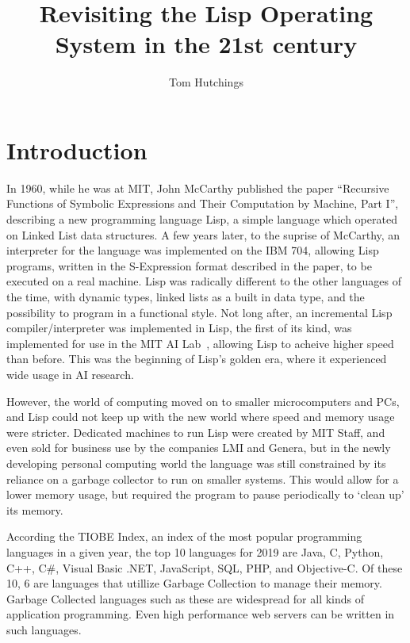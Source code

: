 \documentclass{article}
\begin{document}
  \title{Revisiting the Lisp Operating System in the 21st century}
  \author{Tom Hutchings}

  \maketitle

  \section{Introduction}
  \iffalse
  memory has increased massively
  show language marketshare, point out GC and interpreted languages, i.e. GC usage is viable
  but what about in an OS

  memory sharing hard
  lisp nice UI, fast development


  document split into sections describing the prior research in the topics this project touches on,
  the proposed implementation, resources required
  \fi
  
  In 1960, while he was at MIT, John McCarthy published the paper ``Recursive Functions of Symbolic Expressions and Their Computation by Machine, Part I''\cite{MccarthyJohn1960Rfos}, describing a new programming language Lisp, a simple language which operated on Linked List data structures. A few years later, to the suprise of McCarthy, an interpreter for the language was implemented on the IBM 704, allowing Lisp programs, written in the S-Expression format described in the paper, to be executed on a real machine. Lisp was radically different to the other languages of the time, with dynamic types, linked lists as a built in data type, and the possibility to program in a functional style. Not long after, an incremental Lisp compiler/interpreter was implemented in Lisp, the first of its kind, was implemented for use in the MIT AI Lab~\cite{ai-memo-39}, allowing Lisp to acheive higher speed than before. This was the beginning of Lisp's golden era, where it experienced wide usage in AI research.
  \par
  However, the world of computing moved on to smaller microcomputers and PCs, and Lisp could not keep up with the new world where speed and memory usage were stricter. Dedicated machines to run Lisp were created by MIT Staff, and even sold for business use by the companies LMI and Genera, but in the newly developing personal computing world the language was still constrained by its reliance on a garbage collector to run on smaller systems. This would allow for a lower memory usage, but required the program to pause periodically to `clean up' its memory.
  \par
  According the TIOBE Index, an index of the most popular programming languages in a given year, the top 10 languages for 2019 are Java, C, Python, C++, C\#, Visual Basic .NET, JavaScript, SQL, PHP, and Objective-C. Of these 10, 6 are languages that utillize Garbage Collection to manage their memory. Garbage Collected languages such as these are widespread for all kinds of application programming. Even high performance web servers can be written in such languages. 
\end{document}
